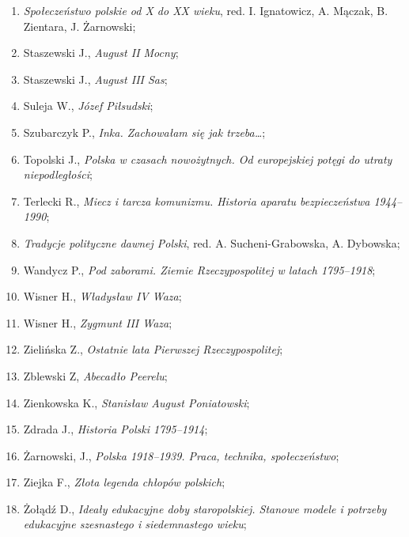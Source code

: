\documentclass[a4paper,11pt]{article}
\begin{document}
\begin{enumerate}
\item \textit{Społeczeństwo polskie od X do XX wieku}, red. I.
  Ignatowicz, A. Mączak, B. Zientara, J. Żarnowski;

\item Staszewski J., \textit{August II Mocny};

\item Staszewski J., \textit{August III Sas};

\item Suleja W., \textit{Józef Piłsudski};

\item Szubarczyk P., \textit{Inka. Zachowałam się jak trzeba\ldots};

\item Topolski J., \textit{Polska w czasach nowożytnych. Od europejskiej
    potęgi do utraty niepodległości};

\item Terlecki R., \textit{Miecz i tarcza komunizmu. Historia aparatu
    bezpieczeństwa 1944--1990};

\item \textit{Tradycje polityczne dawnej Polski}, red. A.
  Sucheni-Grabowska, A. Dybowska;

\item Wandycz P., \textit{Pod zaborami. Ziemie Rzeczypospolitej w latach
    1795--1918};

\item Wisner H., \textit{Władysław IV Waza};

\item Wisner H., \textit{Zygmunt III Waza};

\item Zielińska Z., \textit{Ostatnie lata Pierwszej Rzeczypospolitej};

\item Zblewski Z, \textit{Abecadło Peerelu};

\item Zienkowska K., \textit{Stanisław August Poniatowski};

\item Zdrada J., \textit{Historia Polski 1795--1914};

\item Żarnowski, J., \textit{Polska 1918--1939. Praca, technika,
    społeczeństwo};

\item Ziejka F., \textit{Złota legenda chłopów polskich};

\item Żołądź D., \textit{Ideały edukacyjne doby staropolskiej. Stanowe
    modele i potrzeby edukacyjne szesnastego i siedemnastego wieku};


\end{enumerate}
\end{document}
